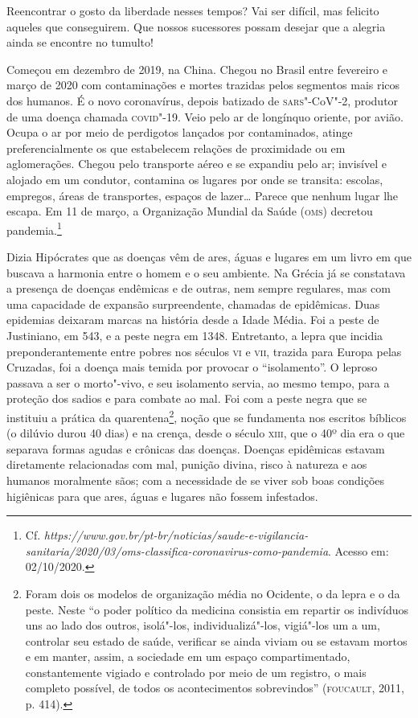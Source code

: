 Reencontrar o gosto da liberdade nesses tempos? Vai ser difícil, mas
felicito aqueles que conseguirem. Que nossos sucessores possam desejar
que a alegria ainda se encontre no tumulto!



\noindent{}Começou em dezembro de 2019, na China. Chegou no Brasil entre fevereiro
e março de 2020 com contaminações e mortes trazidas pelos segmentos mais
ricos dos humanos. É o novo coronavírus, depois batizado de \textsc{sars}"-CoV"-2,
produtor de uma doença chamada \textsc{covid}"-19. Veio pelo ar de longínquo
oriente, por avião. Ocupa o ar por meio de perdigotos lançados por
contaminados, atinge preferencialmente os que estabelecem relações de
proximidade ou em aglomerações. Chegou pelo transporte aéreo e se
expandiu pelo ar; invisível e alojado em um condutor, contamina os
lugares por onde se transita: escolas, empregos, áreas de transportes,
espaços de lazer\ldots{} Parece que nenhum lugar lhe escapa. Em 11 de março,
a Organização Mundial da Saúde (\textsc{oms}) decretou pandemia.\footnote{Cf.
  \emph{https://www.gov.br/pt-br/noticias/saude-e-vigilancia-sanitaria/2020/03/oms-classifica-coronavirus-como-pandemia}.
  Acesso em: 02/10/2020.}

Dizia Hipócrates que as doenças vêm de ares, águas e lugares em um livro
em que buscava a harmonia entre o homem e o seu ambiente. Na Grécia já
se constatava a presença de doenças endêmicas e de outras, nem sempre
regulares, mas com uma capacidade de expansão surpreendente, chamadas de
epidêmicas. Duas epidemias deixaram marcas na história desde a Idade
Média. Foi a peste de Justiniano, em 543, e a peste negra em 1348.
Entretanto, a lepra que incidia preponderantemente entre pobres nos
séculos \textsc{vi} e \textsc{vii}, trazida para Europa pelas Cruzadas, foi a doença mais
temida por provocar o ``isolamento''. O leproso passava a ser o
morto"-vivo, e seu isolamento servia, ao mesmo tempo, para a proteção dos
sadios e para combate ao mal. Foi com a peste negra que se instituiu a
prática da quarentena\footnote{Foram dois os modelos de organização
  média no Ocidente, o da lepra e o da peste. Neste ``o poder político
  da medicina consistia em repartir os indivíduos uns ao lado dos
  outros, isolá"-los, individualizá"-los, vigiá"-los um a um, controlar seu
  estado de saúde, verificar se ainda viviam ou se estavam mortos e em
  manter, assim, a sociedade em um espaço compartimentado,
  constantemente vigiado e controlado por meio de um registro, o mais
  completo possível, de todos os acontecimentos sobrevindos'' (\textsc{foucault},
  2011, p. 414).}, noção que se fundamenta nos escritos bíblicos (o
dilúvio durou 40 dias) e na crença, desde o século \textsc{xiii}, que o 40º dia
era o que separava formas agudas e crônicas das doenças. Doenças
epidêmicas estavam diretamente relacionadas com mal, punição divina,
risco à natureza e aos humanos moralmente sãos; com a necessidade de se
viver sob boas condições higiênicas para que ares, águas e lugares não
fossem infestados.

